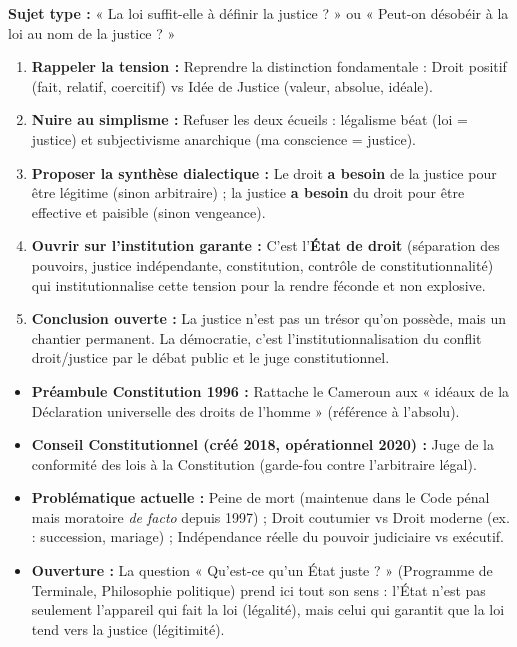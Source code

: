 \documentclass[11pt]{article}
\begin{document}
\begin{methode}
\textbf{Sujet type :} « La loi suffit-elle à définir la justice ? » ou « Peut-on désobéir à la loi au nom de la justice ? »
\begin{enumerate}
    \item \textbf{Rappeler la tension :} Reprendre la distinction fondamentale : Droit positif (fait, relatif, coercitif) vs Idée de Justice (valeur, absolue, idéale).
    \item \textbf{Nuire au simplisme :} Refuser les deux écueils : légalisme béat (loi = justice) et subjectivisme anarchique (ma conscience = justice).
    \item \textbf{Proposer la synthèse dialectique :} Le droit \textbf{a besoin} de la justice pour être légitime (sinon arbitraire) ; la justice \textbf{a besoin} du droit pour être effective et paisible (sinon vengeance).
    \item \textbf{Ouvrir sur l'institution garante :} C'est l'\textbf{État de droit} (séparation des pouvoirs, justice indépendante, constitution, contrôle de constitutionnalité) qui institutionnalise cette tension pour la rendre féconde et non explosive.
    \item \textbf{Conclusion ouverte :} La justice n'est pas un trésor qu'on possède, mais un chantier permanent. La démocratie, c'est l'institutionnalisation du conflit droit/justice par le débat public et le juge constitutionnel.
\end{enumerate}
\end{methode}

\begin{savaistu}
\begin{itemize}
    \item \textbf{Préambule Constitution 1996 :} Rattache le Cameroun aux « idéaux de la Déclaration universelle des droits de l'homme » (référence à l'absolu).
    \item \textbf{Conseil Constitutionnel (créé 2018, opérationnel 2020) :} Juge de la conformité des lois à la Constitution (garde-fou contre l'arbitraire légal).
    \item \textbf{Problématique actuelle :} Peine de mort (maintenue dans le Code pénal mais moratoire \emph{de facto} depuis 1997) ; Droit coutumier vs Droit moderne (ex. : succession, mariage) ; Indépendance réelle du pouvoir judiciaire vs exécutif.
    \item \textbf{Ouverture :} La question « Qu'est-ce qu'un État juste ? » (Programme de Terminale, Philosophie politique) prend ici tout son sens : l'État n'est pas seulement l'appareil qui fait la loi (légalité), mais celui qui garantit que la loi tend vers la justice (légitimité).
\end{itemize}
\end{savaistu}
\end{document}
